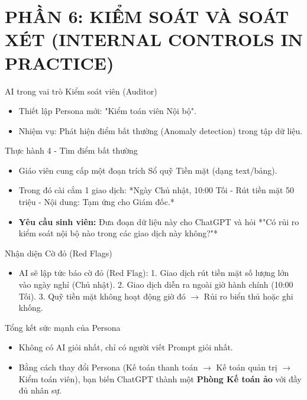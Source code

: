 \documentclass[aspectratio=169]{beamer}
\begin{document}
\section{PHẦN 6: KIỂM SOÁT VÀ SOÁT XÉT (INTERNAL CONTROLS IN PRACTICE)}


\begin{frame}{AI trong vai trò Kiểm soát viên (Auditor)}
    \begin{itemize}
        \item Thiết lập Persona mới: "Kiểm toán viên Nội bộ".
        \item Nhiệm vụ: Phát hiện điểm bất thường (Anomaly detection) trong tập dữ liệu.
    \end{itemize}
\end{frame}


\begin{frame}{Thực hành 4 - Tìm điểm bất thường}
    \begin{itemize}
        \item Giáo viên cung cấp một đoạn trích Sổ quỹ Tiền mặt (dạng text/bảng).
        \item Trong đó cài cắm 1 giao dịch: *Ngày Chủ nhật, 10:00 Tối - Rút tiền mặt 50 triệu - Nội dung: Tạm ứng cho Giám đốc.*
        \item \textbf{Yêu cầu sinh viên:} Đưa đoạn dữ liệu này cho ChatGPT và hỏi *"Có rủi ro kiểm soát nội bộ nào trong các giao dịch này không?"*
    \end{itemize}
\end{frame}


\begin{frame}{Nhận diện Cờ đỏ (Red Flags)}
    \begin{itemize}
        \item AI sẽ lập tức báo cờ đỏ (Red Flag):
        1. Giao dịch rút tiền mặt số lượng lớn vào ngày nghỉ (Chủ nhật).
        2. Giao dịch diễn ra ngoài giờ hành chính (10:00 Tối).
        3. Quỹ tiền mặt không hoạt động giờ đó $\rightarrow$ Rủi ro biển thủ hoặc ghi khống.
    \end{itemize}
\end{frame}


\begin{frame}{Tổng kết sức mạnh của Persona}
    \begin{itemize}
        \item Không có AI giỏi nhất, chỉ có người viết Prompt giỏi nhất.
        \item Bằng cách thay đổi Persona (Kế toán thanh toán $\rightarrow$ Kế toán quản trị $\rightarrow$ Kiểm toán viên), bạn biến ChatGPT thành một \textbf{Phòng Kế toán ảo} với đầy đủ nhân sự.
    \end{itemize}
\end{frame}
\end{document}
